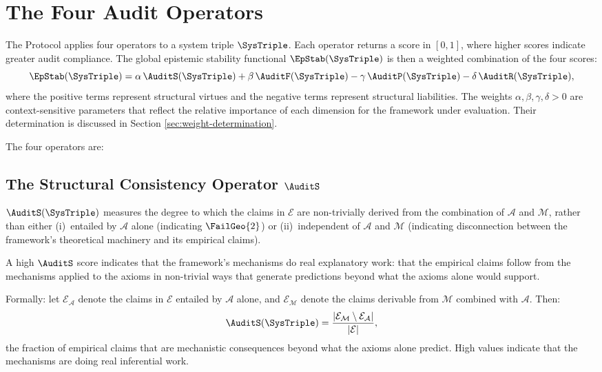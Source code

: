 \section{The Four Audit Operators}
\label{sec:four-operators}

The \Ortyx{} Protocol applies four operators to a system
triple $\SysTriple$. Each operator returns a score in
$[0,1]$, where higher scores indicate greater audit
compliance. The global epistemic stability functional
$\EpStab(\SysTriple)$ is then a weighted combination
of the four scores:
\[
  \EpStab(\SysTriple) = \alpha\,\AuditS(\SysTriple)
  + \beta\,\AuditF(\SysTriple)
  - \gamma\,\AuditP(\SysTriple)
  - \delta\,\AuditR(\SysTriple),
\]
where the positive terms represent structural virtues
and the negative terms represent structural liabilities.
The weights $\alpha, \beta, \gamma, \delta > 0$ are
context-sensitive parameters that reflect the relative
importance of each dimension for the framework under
evaluation. Their determination is discussed in Section
\ref{sec:weight-determination}.

The four operators are:

\subsection{The Structural Consistency Operator \texorpdfstring{$\AuditS$}{S}}
\label{subsec:structural-consistency}

$\AuditS(\SysTriple)$ measures the degree to which the
claims in $\mathcal{E}$ are non-trivially derived from
the combination of $\mathcal{A}$ and $\mathcal{M}$,
rather than either (i)~entailed by $\mathcal{A}$ alone
(indicating $\FailGeo{2}$) or (ii)~independent of
$\mathcal{A}$ and $\mathcal{M}$ (indicating disconnection
between the framework's theoretical machinery and its
empirical claims).

A high $\AuditS$ score indicates that the framework's
mechanisms do real explanatory work: that the empirical
claims follow from the mechanisms applied to the axioms
in non-trivial ways that generate predictions beyond
what the axioms alone would support.

Formally: let $\mathcal{E}_{\mathcal{A}}$ denote the
claims in $\mathcal{E}$ entailed by $\mathcal{A}$ alone,
and $\mathcal{E}_{\mathcal{M}}$ denote the claims derivable
from $\mathcal{M}$ combined with $\mathcal{A}$. Then:
\[
  \AuditS(\SysTriple)
  = \frac{|\mathcal{E}_{\mathcal{M}} \setminus
    \mathcal{E}_{\mathcal{A}}|}{|\mathcal{E}|},
\]
the fraction of empirical claims that are mechanistic
consequences beyond what the axioms alone predict.
High values indicate that the mechanisms are doing
real inferential work.

